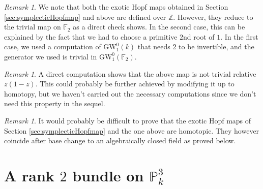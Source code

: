 \documentclass[11pt,leqno]{article}
\newcommand{\jean}[1]{\textcolor{blue}{#1}} %
\newcommand{\Z}{{\mathbb Z}}
\newcommand{\Proj}{{\mathbb P}}
\renewcommand{\1}{{\rm 1\hspace*{-0.4ex}%
\rule{0.1ex}{1.52ex}\hspace*{0.2ex}}}
\newcommand{\<}[1]{{\langle}#1 {\rangle}}
\theoremstyle{plain}
\theoremstyle{definition}
\theoremstyle{remark}
\newtheorem{rem}[thm]{Remark}
\numberwithin{equation}{section}
\begin{document}
\begin{rem}
We note that both the exotic Hopf maps obtained in Section \ref{sec:symplecticHopfmap} and above are defined over $\Z$. However,  they reduce to the trivial map on $\mathbb{F}_2$ as a direct check shows. In the second case, this can be explained by the fact that we had to choose a primitive $2$nd root of $1$. In the first case, we used a computation of $\mathrm{GW}_1^0(k)$ that needs $2$ to be invertible, and the generator we used is trivial in $\mathrm{GW}_1^0(\mathbb{F}_2)$.
\end{rem}

\begin{rem}
A direct computation shows that the above map is not trivial relative $z(1-z)$. This could probably be further achieved by modifying it up to homotopy, but we haven't carried out the necessary computations since we don't need this property in the sequel.
\end{rem}

\begin{rem}
It would probably be difficult to prove that the exotic Hopf maps of Section \ref{sec:symplecticHopfmap} and the one above are homotopic. They however coincide after base change to an algebraically closed field as proved below.
\end{rem}



\section{A rank $2$ bundle on $\Proj^3_k$}
\end{document}
